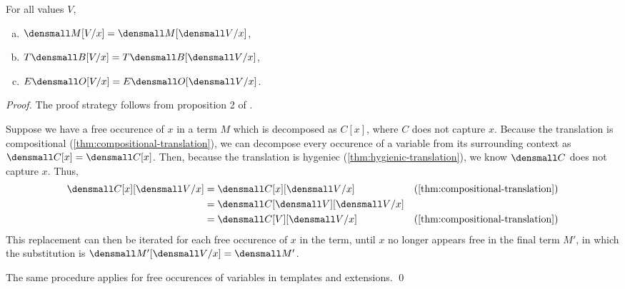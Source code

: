 \begin{lemma}[Substitution]
  \label{thm:substitution-translation}
  For all values $V$,
  \begin{enumerate}[(a)]
  \item $\den{M\subst{x}{V}} = \den{M}\subst{x}{\den{V}}$,
  \item $T\den{B\subst{x}{V}} = T\den{B}\subst{x}{\den{V}}$,
  \item $E\den{O\subst{x}{V}} = E\den{O}\subst{x}{\den{V}}$.
  \end{enumerate}
\end{lemma}
\begin{proof}
  The proof strategy follows from proposition 2 of \cite{DownenAriola2014CSCC}.

  Suppose we have a free occurence of $x$ in a term $M$ which is decomposed as $C[x]$, where $C$ does not capture $x$.
  Because the translation is compositional (\cref{thm:compositional-translation}), we can decompose every occurence of a variable from its surrounding context as $\den{C[x]} = \den{C}{[x]}$.
  Then, because the translation is hygeniec (\cref{thm:hygienic-translation}), we know $\den{C}$ does not capture $x$.
  Thus,
  \begin{align*}
    \den{C[x]}\subst{x}{\den{V}}
    &=
    \den{C}{[x]}\subst{x}{\den{V}}
    &(\cref{thm:compositional-translation})
    \\
    &=
    \den{C}{[\den{V}]}\subst{x}{\den{V}}
    \\
    &=
    \den{C[V]}\subst{x}{\den{V}}
    &(\cref{thm:compositional-translation})
  \end{align*}
  This replacement can then be iterated for each free occurence of $x$ in the term, until $x$ no longer appears free in the final term $M'$, in which the substitution is $\den{M'}\subst{x}{\den{V}} = \den{M'}$.

  The same procedure applies for free occurences of variables in templates and extensions.
  \qed
\end{proof}

